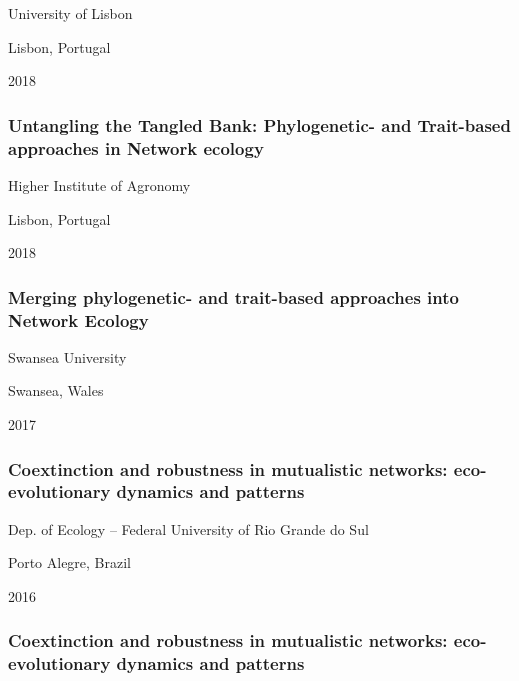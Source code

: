 \documentclass[
]{article}
\begin{document}
University of Lisbon

Lisbon, Portugal

2018

\hypertarget{untangling-the-tangled-bank-phylogenetic--and-trait-based-approaches-in-network-ecology-1}{%
\subsubsection{Untangling the Tangled Bank: Phylogenetic- and
Trait-based approaches in Network
ecology}\label{untangling-the-tangled-bank-phylogenetic--and-trait-based-approaches-in-network-ecology-1}}

Higher Institute of Agronomy

Lisbon, Portugal

2018

\hypertarget{merging-phylogenetic--and-trait-based-approaches-into-network-ecology}{%
\subsubsection{Merging phylogenetic- and trait-based approaches into
Network
Ecology}\label{merging-phylogenetic--and-trait-based-approaches-into-network-ecology}}

Swansea University

Swansea, Wales

2017

\hypertarget{coextinction-and-robustness-in-mutualistic-networks-eco-evolutionary-dynamics-and-patterns}{%
\subsubsection{Coextinction and robustness in mutualistic networks:
eco-evolutionary dynamics and
patterns}\label{coextinction-and-robustness-in-mutualistic-networks-eco-evolutionary-dynamics-and-patterns}}

Dep. of Ecology -- Federal University of Rio Grande do Sul

Porto Alegre, Brazil

2016

\hypertarget{coextinction-and-robustness-in-mutualistic-networks-eco-evolutionary-dynamics-and-patterns-1}{%
\subsubsection{Coextinction and robustness in mutualistic networks:
eco-evolutionary dynamics and
patterns}\label{coextinction-and-robustness-in-mutualistic-networks-eco-evolutionary-dynamics-and-patterns-1}}
\end{document}
